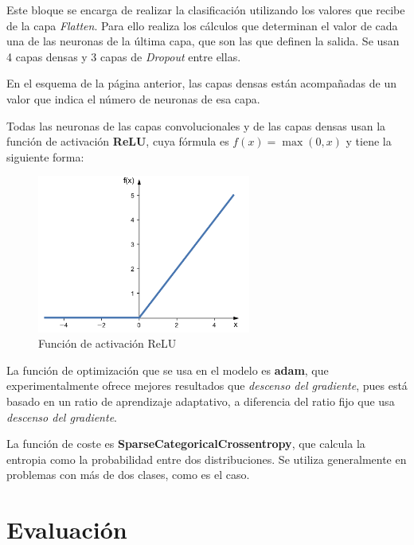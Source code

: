 \documentclass{uc3mpracticas}
\begin{document}
\begin{enumerate}
    Este bloque se encarga de realizar la clasificación utilizando los valores que recibe de la capa \textit{Flatten}. Para ello realiza los cálculos que determinan el valor de cada una de las neuronas de la última capa, que son las que definen la salida. Se usan 4 capas densas y 3 capas de \textit{Dropout} entre ellas.

    \vspace{2mm}

    En el esquema de la página anterior, las capas densas están acompañadas de un valor que indica el número de neuronas de esa capa.

  \end{enumerate}


  Todas las neuronas de las capas convolucionales y de las capas densas usan la función de activación \textbf{ReLU}, cuya fórmula es $ f(x) = \max(0, x) $ y tiene la siguiente forma:

  \begin{figure}[H]
    \centering
    \includegraphics[width=70mm]{Images/ReLU.png}
    \caption{Función de activación ReLU}
  \end{figure}

  La función de optimización que se usa en el modelo es \textbf{adam}, que experimentalmente ofrece mejores resultados que \textit{descenso del gradiente}, pues está basado en un ratio de aprendizaje adaptativo, a diferencia del ratio fijo que usa \textit{descenso del gradiente}.

  \vspace{2mm}

  La función de coste es \textbf{SparseCategoricalCrossentropy}, que calcula la entropia como la probabilidad entre dos distribuciones. Se utiliza generalmente en problemas con más de dos clases, como es el caso.



  \section{Evaluación}
\end{document}

